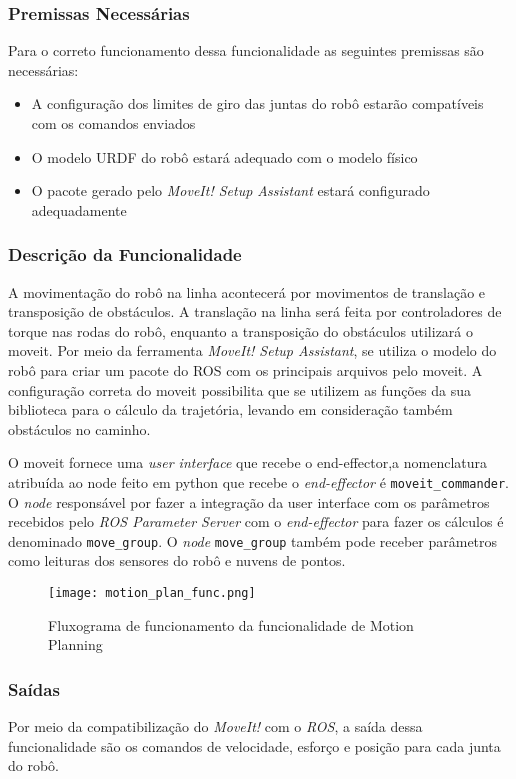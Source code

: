 \subsubsection{Premissas Necessárias}
Para o correto funcionamento dessa funcionalidade as seguintes premissas são necessárias:
\begin{itemize}
	\item A configuração dos limites de giro das juntas do robô estarão compatíveis com os comandos enviados
	\item O modelo URDF do robô estará adequado com o modelo físico
	\item O pacote gerado pelo \textit{MoveIt! Setup Assistant} estará configurado adequadamente
\end{itemize}
\subsubsection{Descrição da Funcionalidade}
A movimentação do robô na linha acontecerá por movimentos de translação e transposição de obstáculos. A translação na linha será feita por controladores de torque nas rodas do robô, enquanto a transposição do obstáculos utilizará o moveit.
Por meio da ferramenta \textit{MoveIt! Setup Assistant}, se utiliza o modelo do robô para criar um pacote do ROS com os principais arquivos pelo moveit. 
A configuração correta do moveit possibilita que se utilizem as funções da sua biblioteca para o cálculo da trajetória, levando em consideração também obstáculos no caminho.

O moveit fornece uma \textit{user interface} que recebe o end-effector,a nomenclatura atribuída ao node feito em python que recebe o \textit{end-effector} é \verb|moveit_commander|. O  \textit{node} responsável por fazer a integração da user interface com os parâmetros recebidos pelo \textit{ROS Parameter Server} com o \textit{end-effector} para fazer os cálculos é denominado \verb|move_group|. O \textit{node} \verb|move_group| também pode receber parâmetros como leituras dos sensores do robô e nuvens de pontos.

\begin{figure}[H]
	\centering
	\texttt{[image: motion\_plan\_func.png]}
	\caption{Fluxograma de funcionamento da funcionalidade de Motion Planning}
	\label{fig:flux_motion}
\end{figure}

\subsubsection{Saídas}
Por meio da compatibilização do \textit{MoveIt!} com o \textit{ROS}, a saída dessa funcionalidade são os comandos de velocidade, esforço e posição para cada junta do robô.

